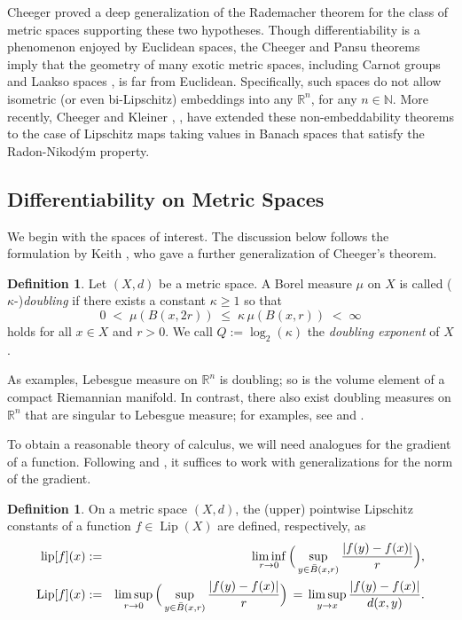 \documentclass[reqno]{amsart}
\theoremstyle{plain}
\theoremstyle{definition}
\newtheorem{defn}[thm]{Definition}
\theoremstyle{remark}
\numberwithin{equation}{section}
\renewcommand{\H}{\mathcal{H}}
\newcommand{\Lip}{\operatorname{Lip}}
\newcommand{\N}{\mathbb{N}}
\newcommand{\R}{\mathbb{R}}
\begin{document}
Cheeger \cite{Cheeger} proved a deep generalization of the Rademacher theorem for the class of metric spaces supporting these two hypotheses.  Though differentiability is a phenomenon enjoyed by Euclidean spaces, the Cheeger and Pansu theorems imply that the geometry of many exotic metric spaces, including Carnot groups and Laakso spaces \cite{Laakso}, is far from Euclidean.  Specifically, such spaces do not allow isometric (or even bi-Lipschitz) embeddings into any $\R^n$, for any $n \in \N$.  More recently, Cheeger and Kleiner \cite{Cheeger:Kleiner}, \cite{Cheeger:Kleiner:gafa}, \cite{Cheeger:Kleiner:annals} have extended these non-embeddability theorems to the case of Lipschitz maps taking values in Banach spaces that satisfy the Radon-Nikod\'ym property.


\subsection{Differentiability on Metric Spaces} \label{sect_intro}

We begin with the spaces of interest.  The discussion below follows the formulation by Keith \cite{Keith}, who gave a further generalization of Cheeger's theorem.

\begin{defn} \label{defn_doubling}
Let $(X,d)$ be a metric space.  A Borel measure $\mu$ on $X$ is called ($\kappa$-){\em doubling} if there exists a constant $\kappa \geq 1$ so that 
$$
0 \;<\; \mu(B(x,2r)) \;\leq\; \kappa\, \mu(B(x,r)) \;<\; \infty
$$
holds for all $x \in X$ and $r > 0$.  We call $Q := \log_2(\kappa)$ the {\em doubling exponent} of $X$.
\end{defn}

As examples, Lebesgue measure on $\R^n$ is doubling; so is the volume element of a compact Riemannian manifold.  In contrast, there also exist doubling measures on $\R^n$ that are singular to Lebesgue measure; for examples, see \cite{Kaufman:Wu} and \cite{Wu}.

To obtain a reasonable theory of calculus, we will need analogues for the gradient of a function.  Following \cite{Semmes} and \cite{Cheeger}, it suffices to work with generalizations for the norm of the gradient.

\begin{defn} \label{defn_ptlip}
On a metric space $(X,d)$, the (upper) %
pointwise Lipschitz constants of a function $f \in \Lip(X)$ %
are defined, respectively, as
\begin{eqnarray*}
{\rm lip}[f](x) &:=&
\liminf_{r \to 0} \Big(
\sup_{y \in \bar{B}(x,r)} \frac{|f(y) - f(x)|}{r}
\Big), \\
\Lip[f](x) %
&:=&
\limsup_{r \to 0} \Big(
\sup_{y \in \bar{B}(x,r)} \frac{|f(y) - f(x)|}{r} 
\Big) \,=\, 
\limsup_{y \to x} \frac{|f(y) - f(x)|}{d(x,y)}.
\end{eqnarray*}
\end{defn}
\end{document}
